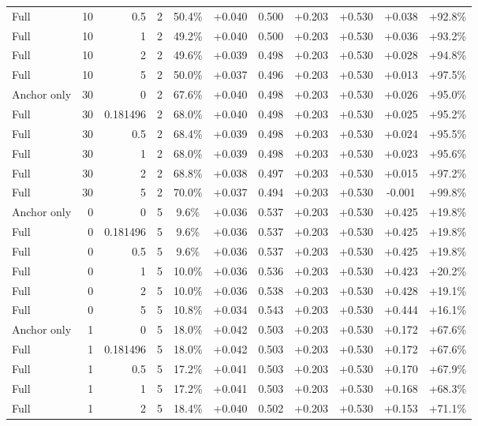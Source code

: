 \begin{table}[htbp]
\begin{tabular}{lrrrccccccc}
Full & 10 & 0.5 & 2 & 50.4\% & +0.040 & 0.500 & +0.203 & +0.530 & +0.038 & +92.8\% \\
Full & 10 & 1 & 2 & 49.2\% & +0.040 & 0.500 & +0.203 & +0.530 & +0.036 & +93.2\% \\
Full & 10 & 2 & 2 & 49.6\% & +0.039 & 0.498 & +0.203 & +0.530 & +0.028 & +94.8\% \\
Full & 10 & 5 & 2 & 50.0\% & +0.037 & 0.496 & +0.203 & +0.530 & +0.013 & +97.5\% \\
Anchor only & 30 & 0 & 2 & 67.6\% & +0.040 & 0.498 & +0.203 & +0.530 & +0.026 & +95.0\% \\
Full & 30 & 0.181496 & 2 & 68.0\% & +0.040 & 0.498 & +0.203 & +0.530 & +0.025 & +95.2\% \\
Full & 30 & 0.5 & 2 & 68.4\% & +0.039 & 0.498 & +0.203 & +0.530 & +0.024 & +95.5\% \\
Full & 30 & 1 & 2 & 68.0\% & +0.039 & 0.498 & +0.203 & +0.530 & +0.023 & +95.6\% \\
Full & 30 & 2 & 2 & 68.8\% & +0.038 & 0.497 & +0.203 & +0.530 & +0.015 & +97.2\% \\
Full & 30 & 5 & 2 & 70.0\% & +0.037 & 0.494 & +0.203 & +0.530 & -0.001 & +99.8\% \\
Anchor only & 0 & 0 & 5 & 9.6\% & +0.036 & 0.537 & +0.203 & +0.530 & +0.425 & +19.8\% \\
Full & 0 & 0.181496 & 5 & 9.6\% & +0.036 & 0.537 & +0.203 & +0.530 & +0.425 & +19.8\% \\
Full & 0 & 0.5 & 5 & 9.6\% & +0.036 & 0.537 & +0.203 & +0.530 & +0.425 & +19.8\% \\
Full & 0 & 1 & 5 & 10.0\% & +0.036 & 0.536 & +0.203 & +0.530 & +0.423 & +20.2\% \\
Full & 0 & 2 & 5 & 10.0\% & +0.036 & 0.538 & +0.203 & +0.530 & +0.428 & +19.1\% \\
Full & 0 & 5 & 5 & 10.8\% & +0.034 & 0.543 & +0.203 & +0.530 & +0.444 & +16.1\% \\
Anchor only & 1 & 0 & 5 & 18.0\% & +0.042 & 0.503 & +0.203 & +0.530 & +0.172 & +67.6\% \\
Full & 1 & 0.181496 & 5 & 18.0\% & +0.042 & 0.503 & +0.203 & +0.530 & +0.172 & +67.6\% \\
Full & 1 & 0.5 & 5 & 17.2\% & +0.041 & 0.503 & +0.203 & +0.530 & +0.170 & +67.9\% \\
Full & 1 & 1 & 5 & 17.2\% & +0.041 & 0.503 & +0.203 & +0.530 & +0.168 & +68.3\% \\
Full & 1 & 2 & 5 & 18.4\% & +0.040 & 0.502 & +0.203 & +0.530 & +0.153 & +71.1\% \\

\end{tabular}
\end{table}
